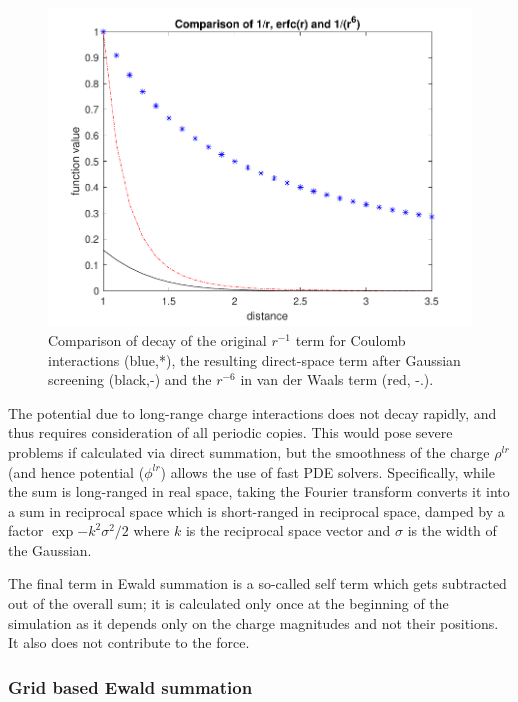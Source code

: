 \documentclass[9pt,bestpractices]{livecoms}
\begin{document}
\begin{figure}[h]
\centering
\includegraphics[width=\linewidth]{decay_comparison.pdf}
    \caption{Comparison of decay of the original $r^{-1}$ term for Coulomb interactions (blue,*), the resulting direct-space term after Gaussian screening (black,-) and the $r^{-6}$ in van der Waals term (red, -.).  }
\label{decay}
\end{figure}


The potential due to long-range charge interactions does not decay rapidly, and thus requires consideration of all periodic copies.
This would pose severe problems if calculated via direct summation, but the smoothness of the charge $\rho^{lr}$ (and hence potential ($\phi^{lr}$) allows the use of fast PDE solvers. 
Specifically, while the sum is long-ranged in real space, taking the Fourier transform converts it into a sum in reciprocal space which is short-ranged in reciprocal space, damped by a factor $\exp{-k^2 \sigma^2/2}$ where $k$ is the reciprocal space vector and $\sigma$ is the width of the Gaussian. 

The final term in Ewald summation is a so-called self term which gets subtracted out of the overall sum; it is calculated only once at the beginning of the simulation as it depends only on the charge magnitudes and not their positions.
It also does not contribute to the force.


\subsubsection{Grid based Ewald summation}
\end{document}
